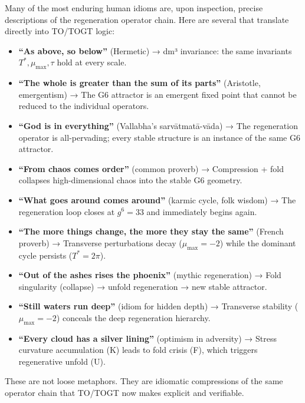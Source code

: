 \documentclass[19pt]{book}
\theoremstyle{plain}
\theoremstyle{definition}
\theoremstyle{remark}
\begin{document}
\begin{enumerate}
\begin{itemize}
Many of the most enduring human idioms are, upon inspection, precise descriptions of the regeneration operator chain. Here are several that translate directly into TO/TOGT logic:

\begin{itemize}
\item \textbf{“As above, so below”} (Hermetic)  
  → dm³ invariance: the same invariants \(T^*, \mu_{\max}, \tau\) hold at every scale.

\item \textbf{“The whole is greater than the sum of its parts”} (Aristotle, emergentism)  
  → The G6 attractor is an emergent fixed point that cannot be reduced to the individual operators.

\item \textbf{“God is in everything”} (Vallabha’s sarvātmatā-vāda)  
  → The regeneration operator is all-pervading; every stable structure is an instance of the same G6 attractor.

\item \textbf{“From chaos comes order”} (common proverb)  
  → Compression + fold collapses high-dimensional chaos into the stable G6 geometry.

\item \textbf{“What goes around comes around”} (karmic cycle, folk wisdom)  
  → The regeneration loop closes at \(g^6 = 33\) and immediately begins again.

\item \textbf{“The more things change, the more they stay the same”} (French proverb)  
  → Transverse perturbations decay (\(\mu_{\max} = -2\)) while the dominant cycle persists (\(T^* = 2\pi\)).

\item \textbf{“Out of the ashes rises the phoenix”} (mythic regeneration)  
  → Fold singularity (collapse) → unfold regeneration → new stable attractor.

\item \textbf{“Still waters run deep”} (idiom for hidden depth)  
  → Transverse stability (\(\mu_{\max} = -2\)) conceals the deep regeneration hierarchy.

\item \textbf{“Every cloud has a silver lining”} (optimism in adversity)  
  → Stress curvature accumulation (K) leads to fold crisis (F), which triggers regenerative unfold (U).
\end{itemize}

These are not loose metaphors. They are idiomatic compressions of the same operator chain that TO/TOGT now makes explicit and verifiable.


\end{itemize}
\end{enumerate}
\end{document}
